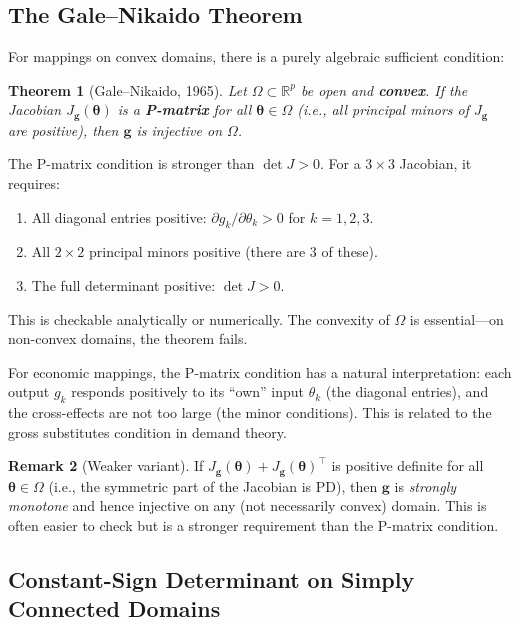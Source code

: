 \documentclass[11pt,a4paper]{article}
\newtheorem{theorem}{Theorem}[section]
\theoremstyle{definition}
\newtheorem{remark}[theorem]{Remark}
\newcommand{\btheta}{\boldsymbol{\theta}}
\begin{document}
\subsection{The Gale--Nikaido Theorem}

For mappings on convex domains, there is a purely algebraic sufficient
condition:

\begin{theorem}[Gale--Nikaido, 1965]
\label{thm:gale_nikaido}
Let $\Omega \subset \mathbb{R}^p$ be open and \textbf{convex}. If the Jacobian
$J_{\mathbf{g}}(\btheta)$ is a \textbf{P-matrix} for all $\btheta \in \Omega$
(i.e., all principal minors of $J_{\mathbf{g}}$ are positive), then
$\mathbf{g}$ is injective on $\Omega$.
\end{theorem}

The P-matrix condition is stronger than $\det J > 0$. For a $3 \times 3$
Jacobian, it requires:
\begin{enumerate}
    \item All diagonal entries positive:
    $\partial g_k / \partial \theta_k > 0$ for $k = 1, 2, 3$.
    \item All $2 \times 2$ principal minors positive (there are 3 of these).
    \item The full determinant positive: $\det J > 0$.
\end{enumerate}
This is checkable analytically or numerically. The convexity of $\Omega$ is
essential---on non-convex domains, the theorem fails.

For economic mappings, the P-matrix condition has a natural interpretation:
each output $g_k$ responds positively to its ``own'' input $\theta_k$ (the
diagonal entries), and the cross-effects are not too large (the minor
conditions). This is related to the gross substitutes condition in demand
theory.

\begin{remark}[Weaker variant]
If $J_{\mathbf{g}}(\btheta) + J_{\mathbf{g}}(\btheta)^\top$ is positive
definite for all $\btheta \in \Omega$ (i.e., the symmetric part of the
Jacobian is PD), then $\mathbf{g}$ is \emph{strongly monotone} and hence
injective on any (not necessarily convex) domain. This is often easier to
check but is a stronger requirement than the P-matrix condition.
\end{remark}


\subsection{Constant-Sign Determinant on Simply Connected Domains}
\end{document}
